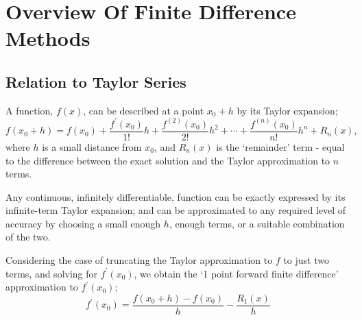 


\section{Overview Of Finite Difference Methods}
\subsection{Relation to Taylor Series}
A function, $f(x)$, can be described at a point $x_{0}+h$  by its Taylor expansion;
$$
f\left(x_{0}+h\right)=f\left(x_{0}\right)+\frac{f^{\prime}\left(x_{0}\right)}{1 !} h+\frac{f^{(2)}\left(x_{0}\right)}{2 !} h^{2}+\cdots+\frac{f^{(n)}\left(x_{0}\right)}{n !} h^{n}+R_{n}(x),
$$
where $h$ is a small distance from $x_{0}$, and $R_{n}(x)$ is the `remainder' term - equal to the difference between the exact solution and the Taylor approximation to $n$ terms.

Any continuous, infinitely differentiable, function can be exactly expressed by its infinite-term Taylor expansion; and can be approximated to any required level of accuracy by choosing a small enough $h$, enough terms, or a suitable combination of the two.

Considering the case of truncating the Taylor approximation to $f$ to just two terms, and solving for $f^{\prime}\left(x_{0}\right)$, we obtain the `1 point forward finite difference' approximation to $f^{\prime}(x_{0})$;
$$
f^{\prime}(x_{0})=\frac{f(x_{0}+h)-f(x_{0})}{h}-\frac{R_{1}(x)}{h}
$$


